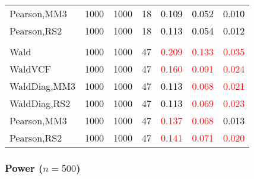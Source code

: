\documentclass[
]{article}
\begin{document}
\begin{table}[H]
{\begin{tabular}[t]{lrrrrrr}
\hspace{1em}Pearson,MM3 & 1000 & 1000 & 18 & \textcolor{black}{0.109} & \textcolor{black}{0.052} & \textcolor{black}{0.010}\\
\hspace{1em}Pearson,RS2 & 1000 & 1000 & 18 & \textcolor{black}{0.113} & \textcolor{black}{0.054} & \textcolor{black}{0.012}\\
\addlinespace[0.3em]
\multicolumn{7}{l}{\textbf{3F 15V}}\\
\hspace{1em}Wald & 1000 & 1000 & 47 & \textcolor{red}{0.209} & \textcolor{red}{0.133} & \textcolor{red}{0.035}\\
\hspace{1em}WaldVCF & 1000 & 1000 & 47 & \textcolor{red}{0.160} & \textcolor{red}{0.091} & \textcolor{red}{0.024}\\
\hspace{1em}WaldDiag,MM3 & 1000 & 1000 & 47 & \textcolor{black}{0.113} & \textcolor{red}{0.068} & \textcolor{red}{0.021}\\
\hspace{1em}WaldDiag,RS2 & 1000 & 1000 & 47 & \textcolor{black}{0.113} & \textcolor{red}{0.069} & \textcolor{red}{0.023}\\
\hspace{1em}Pearson,MM3 & 1000 & 1000 & 47 & \textcolor{red}{0.137} & \textcolor{red}{0.068} & \textcolor{black}{0.013}\\
\hspace{1em}Pearson,RS2 & 1000 & 1000 & 47 & \textcolor{red}{0.141} & \textcolor{red}{0.071} & \textcolor{red}{0.020}\\
\bottomrule
\end{tabular}}
\endgroup{}
\end{table}

\hypertarget{power-n500-2}{%
\subsubsection{\texorpdfstring{Power
(\(n=500\))}{Power (n=500)}}\label{power-n500-2}}
\end{document}

